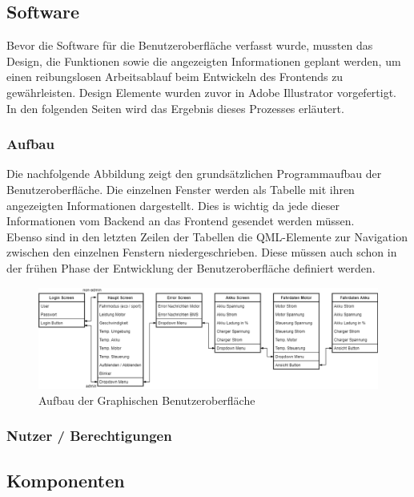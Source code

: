 \subsection{Software}
Bevor die Software für die Benutzeroberfläche verfasst wurde, mussten das Design, die Funktionen sowie die angezeigten Informationen geplant werden, um einen reibungslosen Arbeitsablauf beim Entwickeln des Frontends zu gewährleisten. Design Elemente wurden zuvor in Adobe Illustrator vorgefertigt. In den folgenden Seiten wird das Ergebnis dieses Prozesses erläutert.
\subsubsection{Aufbau}
Die nachfolgende Abbildung zeigt den grundsätzlichen Programmaufbau der Benutzeroberfläche. Die einzelnen Fenster werden als Tabelle mit ihren angezeigten Informationen dargestellt. Dies is wichtig da jede dieser Informationen vom Backend an das Frontend gesendet werden müssen.\\
Ebenso sind in den letzten Zeilen der Tabellen die QML-Elemente  zur Navigation zwischen den einzelnen Fenstern niedergeschrieben. Diese müssen auch schon in der frühen Phase der Entwicklung der Benutzeroberfläche definiert werden.

\begin{figure}[H]
	\begin{center}
		\includegraphics[scale=0.4]{figures/hcis/gui_aufbau.png}
		\caption{Aufbau der Graphischen Benutzeroberfläche}
		\label{fig:aufbauGUI}
	\end{center}
\end{figure}

\newpage

\subsubsection{Nutzer / Berechtigungen}

\subsection{Komponenten}

